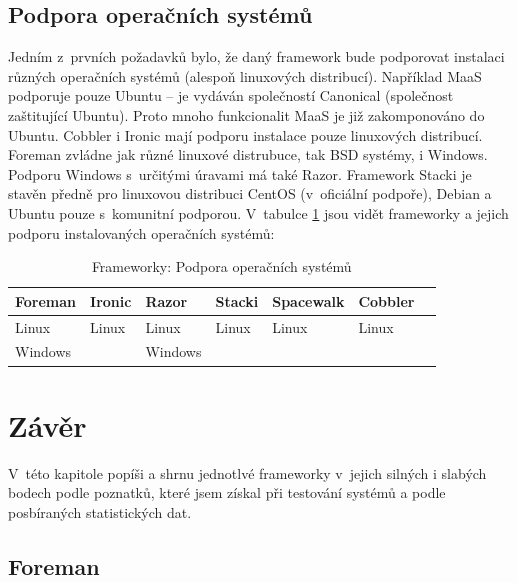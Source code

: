 \subsection{Podpora operačních systémů}

Jedním z~prvních požadavků bylo, že daný framework bude podporovat instalaci různých operačních systémů (alespoň linuxových distribucí). Například MaaS podporuje pouze Ubuntu -- je vydáván společností Canonical (společnost zaštitující Ubuntu). Proto mnoho funkcionalit MaaS je již zakomponováno do Ubuntu. Cobbler i Ironic mají podporu instalace pouze linuxových distribucí. Foreman zvládne jak různé linuxové distrubuce, tak BSD systémy, i Windows. Podporu Windows s~určitými úravami má také Razor. Framework Stacki je stavěn předně pro linuxovou distribuci CentOS (v~oficiální podpoře), Debian a Ubuntu pouze s~komunitní podporou. V~tabulce \ref{Frameworky_os} jsou vidět frameworky a jejich podporu instalovaných operačních systémů:



\begin{table}[h]
\centering
\caption{Frameworky: Podpora operačních systémů}
\label{Frameworky_os}
\begin{tabular}{lllllll}
\toprule

 Foreman & Ironic & Razor & Stacki & Spacewalk & Cobbler \\ \midrule
 Linux        & Linux       & Linux      & Linux       & Linux          & Linux \\
 Windows         &        & Windows      &        &           &

\end{tabular}
\end{table}




\section{Závěr}


V~této kapitole popíši a shrnu jednotlvé frameworky v~jejich silných i slabých bodech podle poznatků, které jsem získal při testování systémů a podle posbíraných statistických dat.


\subsection{Foreman}




